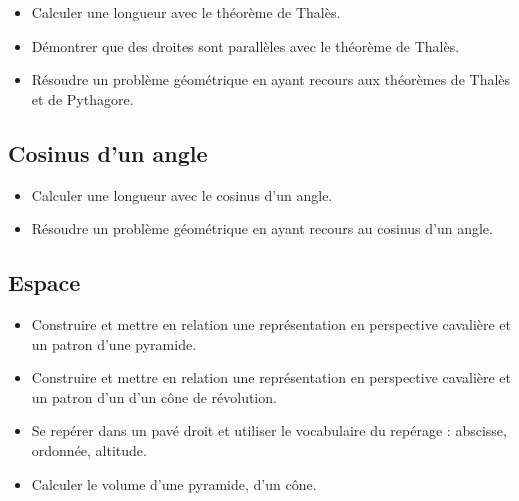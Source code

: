 \documentclass[a4paper,12pt,fleqn]{article}	
\begin{document}
\begin{itemize}
	\item {}Calculer une longueur avec le théorème de Thalès.
	\item {}Démontrer que des droites sont parallèles avec le théorème de Thalès.
	\item {}Résoudre un problème géométrique en ayant recours aux théorèmes de Thalès et de Pythagore.
\end{itemize}

\subsection*{Cosinus d'un angle}

\begin{itemize}
	\item {}Calculer une longueur avec le cosinus d'un angle.
	\item {}Résoudre un problème géométrique en ayant recours au cosinus d'un angle.
\end{itemize}

\subsection*{Espace}

\begin{itemize}
	\item {}Construire et mettre en relation une représentation en perspective cavalière et un patron d’une pyramide.
	\item {}Construire et mettre en relation une représentation en perspective cavalière et un patron d’un d’un cône de révolution.
	\item {}Se repérer dans un pavé droit et utiliser le vocabulaire du repérage : abscisse, ordonnée, altitude.
	\item {}Calculer le volume d’une pyramide, d’un cône.
\end{itemize}
	
\end{document}
